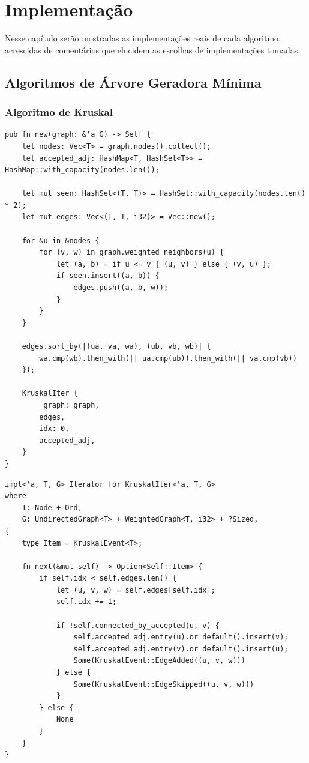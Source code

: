 \chapter{Implementação}
\label{ch:implementation}

Nesse capítulo serão mostradas as implementações reais de cada
algoritmo, acrescidas de comentários que elucidem as escolhas de
implementações tomadas.

\section{Algoritmos de Árvore Geradora Mínima}

\subsection{Algoritmo de Kruskal}

\begin{listing}[H]
  \caption{Construtor do Iterador de Kruskal}
\begin{verbatim}
pub fn new(graph: &'a G) -> Self {
    let nodes: Vec<T> = graph.nodes().collect();
    let accepted_adj: HashMap<T, HashSet<T>> = HashMap::with_capacity(nodes.len());

    let mut seen: HashSet<(T, T)> = HashSet::with_capacity(nodes.len() * 2);
    let mut edges: Vec<(T, T, i32)> = Vec::new();

    for &u in &nodes {
        for (v, w) in graph.weighted_neighbors(u) {
            let (a, b) = if u <= v { (u, v) } else { (v, u) };
            if seen.insert((a, b)) {
                edges.push((a, b, w));
            }
        }
    }

    edges.sort_by(|(ua, va, wa), (ub, vb, wb)| {
        wa.cmp(wb).then_with(|| ua.cmp(ub)).then_with(|| va.cmp(vb))
    });

    KruskalIter {
        _graph: graph,
        edges,
        idx: 0,
        accepted_adj,
    }
}
\end{verbatim}
\end{listing}

\begin{listing}[H]
  \caption{Iteração de Kruskal}
\begin{verbatim}
impl<'a, T, G> Iterator for KruskalIter<'a, T, G>
where
    T: Node + Ord,
    G: UndirectedGraph<T> + WeightedGraph<T, i32> + ?Sized,
{
    type Item = KruskalEvent<T>;

    fn next(&mut self) -> Option<Self::Item> {
        if self.idx < self.edges.len() {
            let (u, v, w) = self.edges[self.idx];
            self.idx += 1;

            if !self.connected_by_accepted(u, v) {
                self.accepted_adj.entry(u).or_default().insert(v);
                self.accepted_adj.entry(v).or_default().insert(u);
                Some(KruskalEvent::EdgeAdded((u, v, w)))
            } else {
                Some(KruskalEvent::EdgeSkipped((u, v, w)))
            }
        } else {
            None
        }
    }
}
\end{verbatim}
\end{listing}


